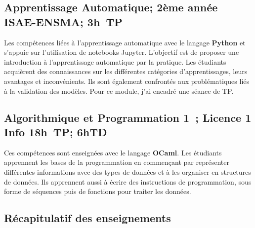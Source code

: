 \documentclass[11pt,a4paper,oneside]{article}
\begin{document}
\subsection{Apprentissage Automatique; 2ème année ISAE-ENSMA; 3h~TP}
Les compétences liées à l'apprentissage automatique avec le langage
\textbf{Python} et s'appuie sur l'utilisation de notebooks Jupyter. %
L'objectif est de proposer une introduction à l'apprentissage automatique par la
pratique. %
Les étudiants acquièrent des connaissances sur les différentes catégories
d'apprentissages, leurs avantages et inconvénients. %
Ils sont également confrontés aux problématiques liés à la validation des
modèles. %
Pour ce module, j'ai encadré une séance de TP. %

\subsection{Algorithmique et Programmation 1~; Licence 1 Info 18h~TP; 6hTD}
Ces compétences sont enseignées avec le langage \textbf{OCaml}. %
Les étudiants apprennent les bases de la programmation en commençant par
représenter différentes informations avec des types de données et à les
organiser en structures de données. %
Ils apprennent aussi à écrire des instructions de programmation, sous forme
de séquences puis de fonctions pour traiter les données. %

\subsection{Récapitulatif des enseignements}
\end{document}

